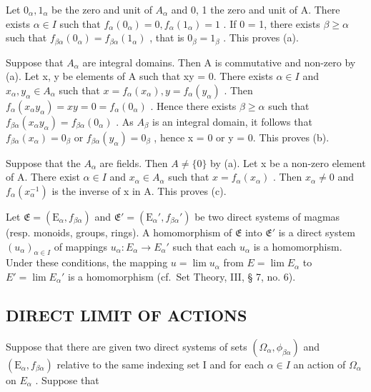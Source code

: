 Let \(0_{\alpha}, 1_{\alpha}\) be the zero and unit of \(A_{\alpha}\) and 0, 1 the zero and unit of A. There exists \(\alpha \in I\) such that \(f_{\alpha}(0_{\alpha}) = 0, f_{\alpha}(1_{\alpha}) = 1\) . If 0 = 1, there exists \(\beta \geqslant \alpha\) such that \(f_{\beta \alpha}(0_{\alpha}) = f_{\beta \alpha}(1_{\alpha})\) , that is \(0_{\beta} = 1_{\beta}\) . This proves (a).

Suppose that \(A_{\alpha}\) are integral domains. Then A is commutative and non-zero by (a). Let x, y be elements of A such that xy = 0. There exists \(\alpha \in I\) and \(x_{\alpha}, y_{\alpha} \in A_{\alpha}\) such that \(x = f_{\alpha}(x_{\alpha}), y = f_{\alpha}(y_{\alpha})\) . Then \(f_{\alpha}(x_{\alpha}y_{\alpha}) = xy = 0 = f_{\alpha}(0_{\alpha})\) . Hence there exists \(\beta \geqslant \alpha\) such that \(f_{\beta\alpha}(x_{\alpha}y_{\alpha}) = f_{\beta\alpha}(0_{\alpha})\) . As \(A_{\beta}\) is an integral domain, it follows that \(f_{\beta\alpha}(x_{\alpha}) = 0_{\beta}\) or \(f_{\beta\alpha}(y_{\alpha}) = 0_{\beta}\) , hence x = 0 or y = 0. This proves (b).

Suppose that the \(A_{\alpha}\) are fields. Then \(A \neq \{0\}\) by (a). Let x be a non-zero element of A. There exist \(\alpha \in I\) and \(x_{\alpha} \in A_{\alpha}\) such that \(x = f_{\alpha}(x_{\alpha})\) . Then \(x_{\alpha} \neq 0\) and \(f_{\alpha}(x_{\alpha}^{-1})\) is the inverse of x in A. This proves (c).

Let \(\mathfrak{E} = (\mathrm{E}_{\alpha}, f_{\beta \alpha})\) and \(\mathfrak{E}' = (\mathrm{E}_{\alpha}', f_{\beta \alpha}')\) be two direct systems of magmas (resp. monoids, groups, rings). A homomorphism of \(\mathfrak{E}\) into \(\mathfrak{E}'\) is a direct system \((u_{\alpha})_{\alpha \in I}\) of mappings \(u_{\alpha} \colon E_{\alpha} \to E_{\alpha}'\) such that each \(u_{\alpha}\) is a homomorphism. Under these conditions, the mapping \(u = \lim u_{\alpha}\) from \(E = \lim E_{\alpha}\) to \(E' = \lim E_{\alpha}'\) is a homomorphism (cf.~Set Theory, III, § 7, no. 6).

\subsection{DIRECT LIMIT OF ACTIONS}

Suppose that there are given two direct systems of sets \((\Omega_{\alpha}, \phi_{\beta\alpha})\) and \((\mathrm{E}_{\alpha}, f_{\beta\alpha})\) relative to the same indexing set I and for each \(\alpha \in I\) an action of \(\Omega_{\alpha}\) on \(E_{\alpha}\) . Suppose that

